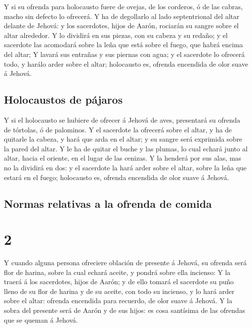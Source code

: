  Y si su ofrenda para holocausto fuere de ovejas, de los
corderos, ó de las cabras, macho sin defecto lo ofrecerá.
 Y ha de degollarlo al lado septentrional del altar
delante de Jehová: y los sacerdotes, hijos de Aarón, rociarán su sangre
sobre el altar alrededor.  Y lo dividirá en sus piezas,
con su cabeza y su redaño; y el sacerdote las acomodará sobre la leña
que está sobre el fuego, que habrá encima del altar;  Y
lavará sus entrañas y sus piernas con agua; y el sacerdote lo ofrecerá
todo, y harálo arder sobre el altar; holocausto es, ofrenda encendida de
olor suave á Jehová.

\hypertarget{holocaustos-de-puxe1jaros}{%
\subsection{Holocaustos de pájaros}\label{holocaustos-de-puxe1jaros}}

 Y si el holocausto se hubiere de ofrecer á Jehová de
aves, presentará su ofrenda de tórtolas, ó de palominos. 
Y el sacerdote la ofrecerá sobre el altar, y ha de quitarle la cabeza, y
hará que arda en el altar; y su sangre será exprimida sobre la pared del
altar.  Y le ha de quitar el buche y las plumas, lo cual
echará junto al altar, hacia el oriente, en el lugar de las cenizas.
 Y la henderá por sus alas, mas no la dividirá en dos: y
el sacerdote la hará arder sobre el altar, sobre la leña que estará en
el fuego; holocausto es, ofrenda encendida de olor suave á Jehová.

\hypertarget{normas-relativas-a-la-ofrenda-de-comida}{%
\subsection{Normas relativas a la ofrenda de
comida}\label{normas-relativas-a-la-ofrenda-de-comida}}

\hypertarget{section-1}{%
\section{2}\label{section-1}}

 Y cuando alguna persona ofreciere oblación de presente á
Jehová, su ofrenda será flor de harina, sobre la cual echará aceite, y
pondrá sobre ella incienso:  Y la traerá á los sacerdotes,
hijos de Aarón; y de ello tomará el sacerdote su puño lleno de su flor
de harina y de su aceite, con todo su incienso, y lo hará arder sobre el
altar: ofrenda encendida para recuerdo, de olor suave á Jehová.
 Y la sobra del presente será de Aarón y de sus hijos: es
cosa santísima de las ofrendas que se queman á Jehová.


